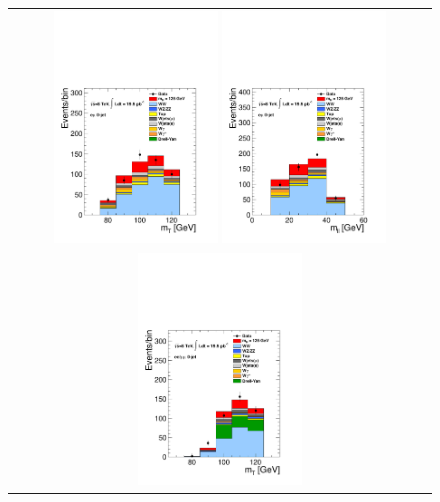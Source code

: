 \begin{figure}[htp] 
\centering 
\begin{tabular}{c} 
\includegraphics[width=0.4\textwidth]{figures/hww_analysis17_125_ALL_of_0j_mt.pdf}
\includegraphics[width=0.4\textwidth]{figures/hww_analysis17_125_ALL_of_0j_mll.pdf} 
\\
\includegraphics[width=0.4\textwidth]{figures/hww_analysis17_125_ALL_sf_0j_mt.pdf}

\end{tabular}
\end{figure}
